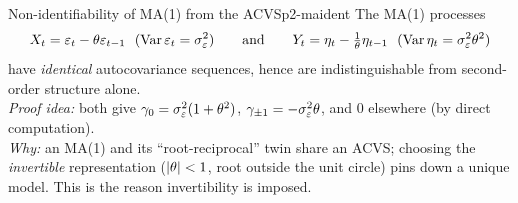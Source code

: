 \begin{proposition}{Non-identifiability of MA(1) from the ACVS}{p2-maident}
The MA(1) processes
\[
X_t=\eps_t-\theta\eps_{t-1}\ \ (\Var\eps_t=\sigma_\eps^2)
\qquad\text{and}\qquad
Y_t=\eta_t-\tfrac1\theta\eta_{t-1}\ \ (\Var\eta_t=\sigma_\eps^2\theta^2)
\]
have \emph{identical} autocovariance sequences, hence are indistinguishable from
second-order structure alone.\\
\textit{Proof idea:} both give
$\gamma_0=\sigma_\varepsilon^2(1+\theta^2)$, $\gamma_{\pm1}=-\sigma_\varepsilon^2\theta$, and $0$
elsewhere (by direct computation).\\
\textit{Why:} an MA(1) and its ``root-reciprocal'' twin share an ACVS; choosing
the \emph{invertible} representation ($\left\lvert \theta \right\rvert<1$, root outside the unit
circle) pins down a unique model. This is the reason invertibility is imposed.
\end{proposition}

